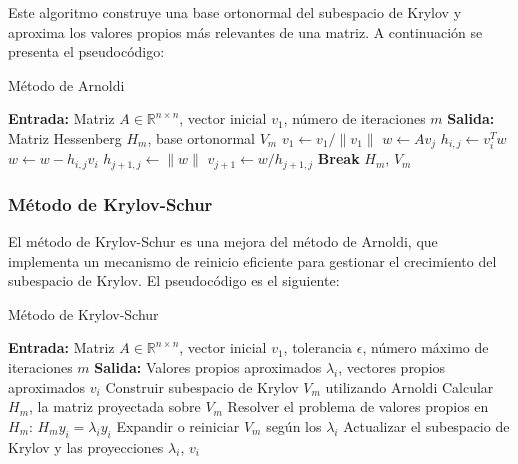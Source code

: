 \documentclass{article}
\begin{document}
Este algoritmo construye una base ortonormal del subespacio de Krylov y aproxima los valores propios más relevantes de una matriz. A continuación se presenta el pseudocódigo:

\begin{algorithm}[H]
\caption{Método de Arnoldi}
\begin{algorithmic}[1]
\State \textbf{Entrada:} Matriz $A \in \mathbb{R}^{n \times n}$, vector inicial $v_1$, número de iteraciones $m$
\State \textbf{Salida:} Matriz Hessenberg $H_m$, base ortonormal $V_m$
\State $v_1 \gets v_1 / \|v_1\|$ 
    \State $w \gets A v_j$ 
        \State $h_{i,j} \gets v_i^T w$ 
        \State $w \gets w - h_{i,j} v_i$ 
    \EndFor
    \State $h_{j+1,j} \gets \|w\|$
        \State $v_{j+1} \gets w / h_{j+1,j}$ 
    \Else
        \State \textbf{Break} 
    \EndIf
\EndFor
\State \Return $H_m$, $V_m$
\end{algorithmic}
\end{algorithm}


\newpage
\subsubsection{Método de Krylov-Schur}

El método de Krylov-Schur es una mejora del método de Arnoldi, que implementa un mecanismo de reinicio eficiente para gestionar el crecimiento del subespacio de Krylov. El pseudocódigo es el siguiente:

\begin{algorithm}[H]
\caption{Método de Krylov-Schur}
\begin{algorithmic}[1]
\State \textbf{Entrada:} Matriz $A \in \mathbb{R}^{n \times n}$, vector inicial $v_1$, tolerancia $\epsilon$, número máximo de iteraciones $m$
\State \textbf{Salida:} Valores propios aproximados $\lambda_i$, vectores propios aproximados $v_i$
\State Construir subespacio de Krylov $V_m$ utilizando Arnoldi
\State Calcular $H_m$, la matriz proyectada sobre $V_m$
    \State Resolver el problema de valores propios en $H_m$: $H_m y_i = \lambda_i y_i$
    \State Expandir o reiniciar $V_m$ según los $\lambda_i$
    \State Actualizar el subespacio de Krylov y las proyecciones
\EndWhile
\State \Return $\lambda_i$, $v_i$
\end{algorithmic}
\end{algorithm}
\end{document}
